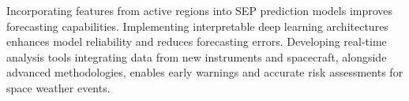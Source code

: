 Incorporating features from active regions into SEP prediction models improves forecasting capabilities. Implementing interpretable deep learning architectures enhances model reliability and reduces forecasting errors.
Developing real-time analysis tools integrating data from new instruments and spacecraft, alongside advanced methodologies, enables early warnings and accurate risk assessments for space weather events.